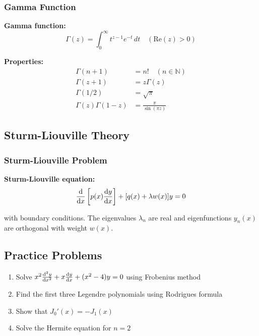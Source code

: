 \documentclass[12pt,a4paper]{article}
\begin{document}
\subsubsection{Gamma Function}
\begin{formulabox}
\textbf{Gamma function:}
\begin{equation}
\Gamma(z) = \int_0^{\infty} t^{z-1} e^{-t} \, dt \quad (\text{Re}(z) > 0)
\end{equation}

\textbf{Properties:}
\begin{align}
\Gamma(n+1) &= n! \quad (n \in \mathbb{N}) \\
\Gamma(z+1) &= z\Gamma(z) \\
\Gamma(1/2) &= \sqrt{\pi} \\
\Gamma(z)\Gamma(1-z) &= \frac{\pi}{\sin(\pi z)}
\end{align}
\end{formulabox}

\subsection{Sturm-Liouville Theory}
\subsubsection{Sturm-Liouville Problem}
\begin{formulabox}
\textbf{Sturm-Liouville equation:}
\begin{equation}
\dv{}{x}\left[p(x)\dv{y}{x}\right] + [q(x) + \lambda w(x)]y = 0
\end{equation}

with boundary conditions. The eigenvalues $\lambda_n$ are real and eigenfunctions $y_n(x)$ are orthogonal with weight $w(x)$.
\end{formulabox}

\subsection{Practice Problems}
\begin{enumerate}
    \item Solve $x^2\dv[2]{y}{x} + x\dv{y}{x} + (x^2 - 4)y = 0$ using Frobenius method
    \item Find the first three Legendre polynomials using Rodrigues formula
    \item Show that $J_0'(x) = -J_1(x)$
    \item Solve the Hermite equation for $n = 2$
\end{enumerate}
\end{document}
